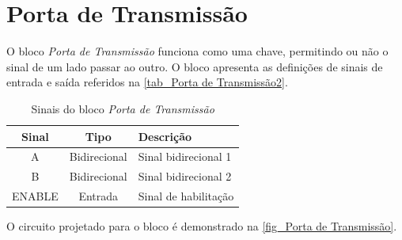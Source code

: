 \renewcommand{\NomeBloco}{\emph{Porta de Transmissão}}
\renewcommand{\NomeBlocoNoIt}{Porta de Transmissão}
\renewcommand{\NomePTab}{tab_\NomeBlocoNoIt}
\renewcommand{\NomeSTab}{tab_\NomeBlocoNoIt2}
\renewcommand{\NomePFig}{fig_\NomeBlocoNoIt}
\renewcommand{\NomeSFig}{fig_\NomeBlocoNoIt2}
\renewcommand{\NomeTTab}{tab_\NomeBlocoNoIt3}

\section{Porta de Transmissão}
\label{portatg}

O bloco \emph{\NomeBloco{}} funciona como uma chave, permitindo ou não o sinal de um lado passar ao outro. O bloco apresenta as definições de sinais de entrada e sa\'ida referidos na \autoref{\NomeSTab}.

\begin{table}[htbp]
\caption{Sinais do bloco \emph{\NomeBloco}}
\label{\NomeSTab}
\centering
\begin{tabular}{ccl}

    \toprule
    Sinal & Tipo    & Descrição        \\
    \midrule \midrule
    A & Bidirecional & Sinal bidirecional 1\\
    \midrule
    B & Bidirecional & Sinal bidirecional 2\\
    \midrule
    ENABLE & Entrada & Sinal de habilitação\\
    \bottomrule
\end{tabular}
\end{table}

O circuito projetado para o bloco \'e demonstrado na \autoref{\NomePFig}.

